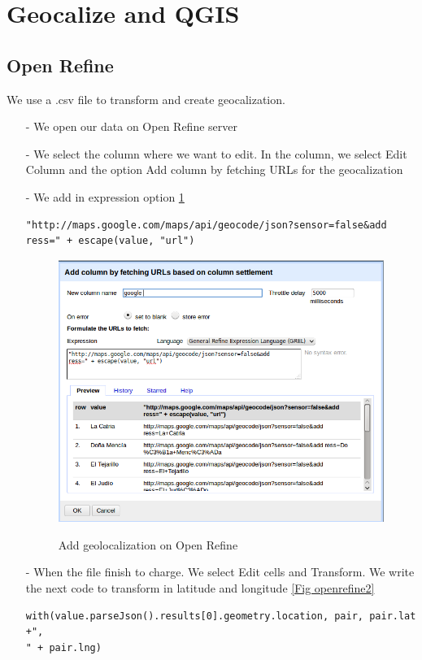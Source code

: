 \documentclass[10pt,a4paper]{article}
\begin{document}
\section{Geocalize and QGIS}

\subsection{Open Refine}

We use a .csv file to transform and create geocalization.

\begin{itemize}
\item[-] We open our data on Open Refine server
\item[-] We select the column where we want to edit. In the column, we select Edit Column and the option Add column by fetching URLs for the geocalization
\item[-]We add in expression option \ref{openrefine1}
\begin{verbatim}
"http://maps.google.com/maps/api/geocode/json?sensor=false&add
ress=" + escape(value, "url")
\end{verbatim}

\begin{figure}[hdp]
\centering
\includegraphics[scale=0.50]{openrefine1.png}
\label{openrefine1}
\caption{Add geolocalization on Open Refine}
\end{figure}

\item[-] When the file finish to charge. We select Edit cells and Transform. We write the next code to transform in latitude and longitude \ref{Fig openrefine2}
\begin{verbatim}
with(value.parseJson().results[0].geometry.location, pair, pair.lat +",
" + pair.lng)
\end{verbatim}


\end{itemize}
\end{document}
